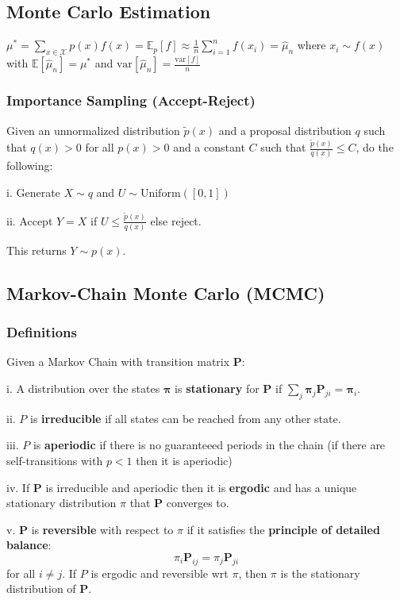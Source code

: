 \documentclass[9pt]{article}
\begin{document}
\begin{multicols}{2}
\subsection{Monte Carlo Estimation}
$\mu^*=\sum\limits_{x \in \mathcal{X}}p(x)f(x)=\mathbb{E}_p[f] 
\approx \frac{1}{n}\sum_{i=1}^{n}f(x_i)=\hat{\mu}_{n}$ where
$x_i \sim f(x)$ with $\mathbb{E}[\hat\mu_n] = \mu^*$ and $\text{var}[\hat\mu_n]=\frac{\text{var}[f]}{n}$

\subsubsection{Importance Sampling (Accept-Reject)}
Given an unnormalized distribution $\tilde{p}(x)$ and a proposal
distribution $q$ such that $q(x) > 0$ for all $p(x) > 0$ and a
constant $C$ such that $\frac{\tilde{p}(x)}{q(x)} \le C$, do the
following:

i. Generate $X \sim q$ and $U \sim \text{Uniform}([0,1])$

ii. Accept $Y=X$ if $U \le \frac{\tilde{p}(x)}{q(x)}$ else reject.

This returns $Y \sim p(x)$. 
\subsection{Markov-Chain Monte Carlo (MCMC)}
\subsubsection{Definitions}
Given a Markov Chain with transition matrix $\mathbf{P}$:

i. A distribution over the states $\mathbf{\pi}$ is \textbf{stationary} for 
$\mathbf{P}$ if $\sum_{j}\mathbf{\pi}_j\mathbf{P}_{ji}=\mathbf{\pi}_i$. 

ii. $P$ is \textbf{irreducible} if all states can be reached from any other state.

iii. $P$ is \textbf{aperiodic} if there is no guaranteeed periods in
the chain (if there are self-transitions with $p < 1$ then it is
aperiodic)

iv. If $\mathbf{P}$ is irreducible and aperiodic then it is \textbf{ergodic}
and has a unique stationary distribution $\pi$ that $\mathbf{P}$ converges
to. 

v.  $\mathbf{P}$ is \textbf{reversible} with respect to $\pi$ if it satisfies the \textbf{principle of detailed balance}:
$$\pi_{i}\mathbf{P}_{ij}=\pi_j\mathbf{P}_{ji}$$ for all $i \ne j$. 
If $P$ is ergodic and reversible wrt $\pi$, then $\pi$ is the 
stationary distribution of $\mathbf{P}$.



\end{multicols}
\end{document}
